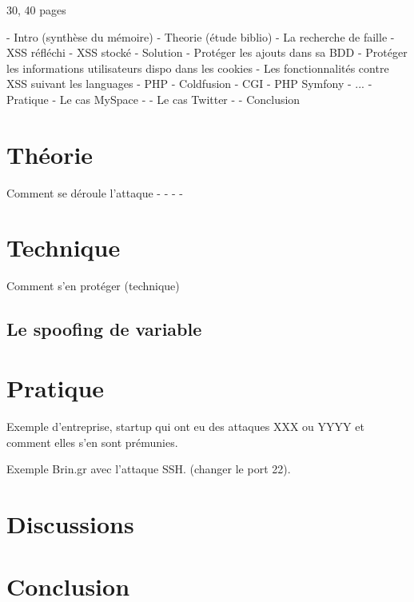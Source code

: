 \documentclass[a4paper,12pt]{report}
\begin{document}
\begin{onehalfspace}
30, 40 pages

- Intro (synthèse du mémoire)
- Theorie (étude biblio)
  - La recherche de faille
  - XSS réfléchi
  - XSS stocké
- Solution
  - Protéger les ajouts dans sa BDD
  - Protéger les informations utilisateurs dispo dans les cookies
  - Les fonctionnalités contre XSS suivant les languages
    - PHP
    - Coldfusion
    - CGI
    - PHP Symfony
    - ...
- Pratique
  - Le cas MySpace
    -
  - Le cas Twitter
    -
- Conclusion

\chapter{Théorie} %
\label{cha:th_orie}

Comment se déroule l'attaque
-
-
-
-

\clearpage

\chapter{Technique} %
\label{cha:technique}

Comment s'en protéger (technique)

\section{Le spoofing de variable} %
\label{sec:le_spoofing_de_variable}



\clearpage

\chapter{Pratique} %
\label{cha:pratique}

Exemple d'entreprise, startup qui ont eu des attaques XXX ou YYYY et comment elles s'en sont prémunies.

Exemple Brin.gr avec l'attaque SSH. (changer le port 22).

\clearpage

\chapter{Discussions} %
\label{cha:discussions}

\clearpage

\chapter{Conclusion} %
\label{cha:conclusion}

\clearpage


\end{onehalfspace}
\end{document}
